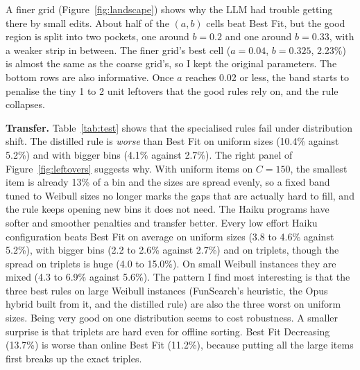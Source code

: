 \documentclass[10pt]{article}
\begin{document}
A finer grid (Figure~\ref{fig:landscape}) shows why the LLM had trouble getting there by small
edits. About half of the $(a,b)$ cells beat Best Fit, but the good region is split into two pockets,
one around $b=0.2$ and one around $b=0.33$, with a weaker strip in between. The finer grid's best
cell ($a=0.04$, $b=0.325$, 2.23\%) is almost the same as the coarse grid's, so I kept the original
parameters. The bottom rows are also informative. Once $a$ reaches 0.02 or less, the band starts to
penalise the tiny 1 to 2 unit leftovers that the good rules rely on, and the rule collapses.

\begin{table}[t]
\centering\scriptsize

\caption{Held-out excess over $L_1$ (\%). Rows for evolved programs give the mean over seeds, with
[min, max] in brackets. Triplet instances have a known optimum of $n/3$ bins, so they measure the
true gap. ``b60'' is the Opus high run's planned budget; the spending cap stopped it after 25
proposals.}
\label{tab:test}
\end{table}

\textbf{Transfer.} Table~\ref{tab:test} shows that the specialised rules fail under distribution
shift. The distilled rule is \emph{worse} than Best Fit on uniform sizes (10.4\% against 5.2\%) and
with bigger bins (4.1\% against 2.7\%). The right panel of Figure~\ref{fig:leftovers} suggests why.
With uniform items on $C=150$, the smallest item is already 13\% of a bin and the sizes are spread
evenly, so a fixed band tuned to Weibull sizes no longer marks the gaps that are actually hard to
fill, and the rule keeps opening new bins it does not need. The Haiku programs have softer and smoother
penalties and transfer better. Every low effort Haiku configuration beats Best Fit on average on
uniform sizes (3.8 to 4.6\% against 5.2\%), with bigger bins (2.2 to 2.6\% against 2.7\%) and on
triplets, though the spread on triplets is huge (4.0 to 15.0\%). On small Weibull instances they are
mixed (4.3 to 6.9\% against 5.6\%). The pattern I find most interesting is that the three best rules
on large Weibull instances (FunSearch's heuristic, the Opus hybrid built from it, and the distilled
rule) are also the three worst on uniform sizes. Being very good on one distribution seems to cost
robustness. A smaller surprise is that triplets are hard even for offline sorting. Best Fit Decreasing
(13.7\%) is worse than online Best Fit (11.2\%), because putting all the large items first breaks up
the exact triples.
\end{document}
